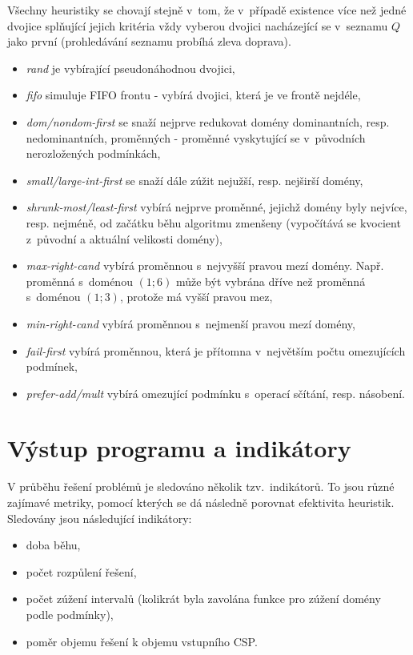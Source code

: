 Všechny heuristiky se chovají stejně v~tom, že v~případě existence více než jedné dvojice splňující jejich kritéria vždy vyberou dvojici nacházející se v~seznamu $Q$ jako první (prohledávání seznamu probíhá zleva doprava).

\begin{itemize}
  \item \emph{rand} je  vybírající pseudonáhodnou dvojici,
  \item \emph{fifo} simuluje FIFO frontu - vybírá dvojici, která je ve frontě nejdéle,
  \item \emph{dom/nondom-first} \cite{feiten10} se snaží nejprve redukovat domény dominantních, resp. nedominantních, proměnných - proměnné vyskytující se v~původních nerozložených podmínkách,
  \item \emph{small/large-int-first} \cite{feiten10} se snaží dále zúžit nejužší, resp. nejširší domény,
  \item \emph{shrunk-most/least-first} \cite{feiten10} vybírá nejprve proměnné, jejichž domény byly nejvíce, resp. nejméně, od začátku běhu algoritmu zmenšeny (vypočítává se kvocient z~původní a aktuální velikosti domény),
  \item \emph{max-right-cand} \cite{feiten10} vybírá proměnnou s~nejvyšší pravou mezí domény. Např. proměnná s~doménou $(1;6)$ může být vybrána dříve než proměnná s~doménou $(1;3)$, protože má vyšší pravou mez,
  \item \emph{min-right-cand} \cite{feiten10} vybírá proměnnou s~nejmenší pravou mezí domény,
  \item \emph{fail-first} vybírá proměnnou, která je přítomna v~největším počtu omezujících podmínek,
  \item \emph{prefer-add/mult} vybírá omezující podmínku s~operací sčítání, resp. násobení.
\end{itemize}

\section{Výstup programu a indikátory}
\label{ch:indicators}
V průběhu řešení problémů je sledováno několik tzv.~indikátorů. To jsou různé zajímavé metriky, pomocí kterých se dá následně porovnat efektivita heuristik. Sledovány jsou následující indikátory:
\begin{itemize}
    \item doba běhu,
    \item počet rozpůlení řešení,
    \item počet zúžení intervalů (kolikrát byla zavolána funkce pro zúžení domény podle podmínky),
    \item poměr objemu řešení k objemu vstupního CSP.
\end{itemize}

